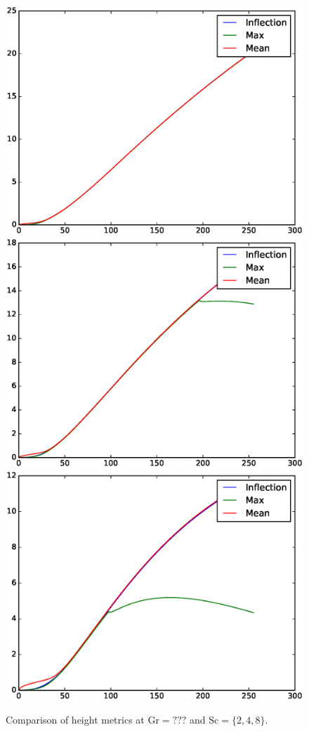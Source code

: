 \begin{figure}
\includegraphics[width=\columnwidth]{figs/comp-height-0.0008-0.0002.eps}
\includegraphics[width=\columnwidth]{figs/comp-height-0.0008-0.0004.eps}
\includegraphics[width=\columnwidth]{figs/comp-height-0.0008-0.0008.eps}
\caption{
  Comparison of height metrics at $\text{Gr} = ???$ and $\text{Sc} = \{2, 4, 8\}$.
}
\end{figure}

